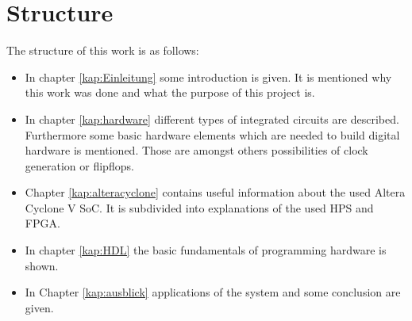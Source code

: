 \section{Structure}
The structure of this work is as follows:
\begin{itemize}
\item In chapter \ref{kap:Einleitung} some introduction is given. It is mentioned why this work was done and what the purpose of this project is.
\item In chapter \ref{kap:hardware} different types of integrated circuits are described. Furthermore some basic hardware elements which are needed to build digital hardware is mentioned. Those are amongst others possibilities of clock generation or flipflops.
\item Chapter \ref{kap:alteracyclone} contains useful information about the used Altera Cyclone V SoC. It is subdivided into explanations of the used HPS and FPGA.
\item In chapter \ref{kap:HDL} the basic fundamentals of programming hardware is shown.
\item In Chapter \ref{kap:ausblick} applications of the system and some conclusion are given.
\end{itemize}